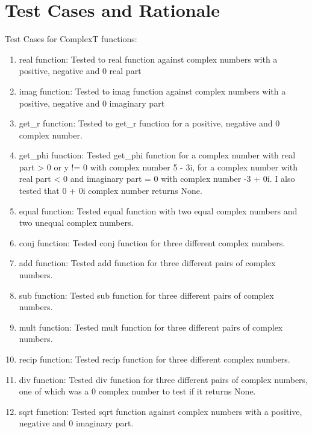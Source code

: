 \documentclass[12pt]{article}
\begin{document}
\section{Test Cases and Rationale} \label{Testing}

Test Cases for ComplexT functions:

\begin{enumerate}
    
\item real function: Tested to real function against complex numbers with a positive, negative and 0 real part

\item imag function: Tested to imag function against complex numbers with a positive, negative and 0 imaginary part

\item get\_r function: Tested to get\_r function for a positive, negative and 0 complex number.

\item get\_phi function: Tested get\_phi function for a complex number with real part > 0 or y != 0 with complex number 5 - 3i, for a complex number with real part < 0 and imaginary part = 0 with complex number -3 + 0i. I also tested that 0 + 0i complex number returns None.

\item equal function: Tested equal function with two equal complex numbers and two unequal complex numbers.

\item conj function: Tested conj function for three different complex numbers.

\item add function: Tested add function for three different pairs of complex numbers.

\item sub function: Tested sub function for three different pairs of complex numbers.

\item mult function: Tested mult function for three different pairs of complex numbers.

\item recip function: Tested recip function for three different complex numbers.

\item div function: Tested div function for three different pairs of complex numbers, one of which was a 0 complex number to test if it returns None.

\item sqrt function: Tested sqrt function against complex numbers with a positive, negative and 0 imaginary part.

\end{enumerate}
\end{document}
